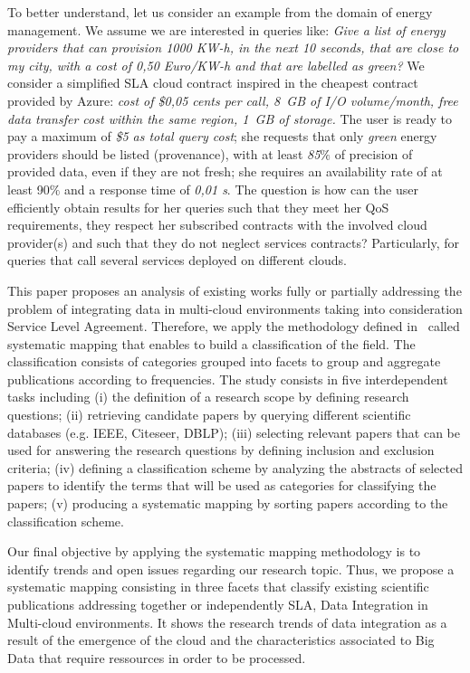 To better understand, let us consider an example from the domain of energy
management. We assume we are interested in queries like: \textit{Give a list
of energy providers that can provision 1000 KW-h, in the next 10 seconds, that are close to my city, with a cost of 0,50 Euro/KW-h and that are labelled as green?} We consider a simplified SLA cloud contract inspired in the cheapest contract provided by Azure: \textit{cost of \$0,05 cents per call,  8~GB of I/O volume/month, free data transfer cost within the same region,  1~GB of storage.} 
The user is ready to pay a maximum of \textit{\$5 as total query cost}; she requests that only  \textit{green} energy providers should be  listed (provenance), with at least  \textit{85$\%$} of precision of provided data, even if they are not fresh; she requires an availability rate of at least 90$\%$ and a response time of  \textit{0,01 s}. 
  The question is how can the user efficiently obtain  results for her queries such that they meet her QoS requirements, they respect her subscribed contracts with the involved cloud provider(s) and such that they do not neglect services contracts? Particularly, for queries that call several services deployed  on different clouds.

This paper proposes an analysis of existing works fully or partially addressing the problem of integrating data in multi-cloud environments taking into consideration Service Level Agreement. Therefore, we apply the  methodology defined in~\cite{SM:Petersen:2008} called  systematic mapping  that enables to build a classification of the field. The classification consists of categories grouped into facets  to group and aggregate  publications according to frequencies. The study consists in  five interdependent tasks including (i) the definition of a research scope by defining research questions; (ii) retrieving candidate papers by querying different scientific databases (e.g. IEEE, Citeseer, DBLP); (iii) selecting relevant papers that can be used for answering the research questions by defining inclusion and exclusion criteria; (iv) defining a classification scheme by  analyzing the abstracts of selected papers to identify the terms that will be used as categories for classifying the papers; (v) producing a systematic mapping by sorting papers according to the classification scheme. 

Our final objective by applying the systematic mapping methodology is to identify trends and open issues regarding our research topic. Thus, we propose a systematic mapping consisting in three facets that classify existing scientific publications addressing  together or independently SLA, Data Integration in Multi-cloud environments. It shows the research trends of data integration as a result of the emergence of the cloud and the characteristics associated to Big Data that require ressources in order to be processed.



